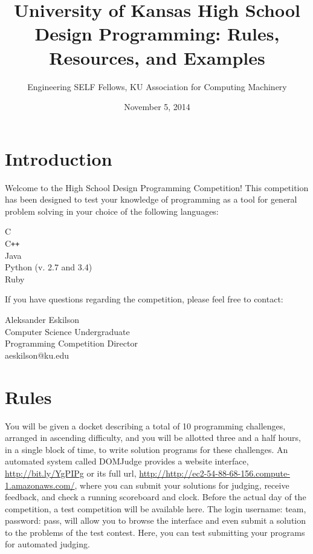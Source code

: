 \documentclass[a4paper]{article}
\title{University of Kansas High School Design Programming: Rules, Resources, and Examples}
\date{November 5, 2014}
\author{Engineering SELF Fellows, KU Association for Computing Machinery}
\begin{document}
\lstset{
    language=java,
    basicstyle=\ttfamily,
    numbers=left,
    numbersep=8pt,
    showspaces=false,
    showstringspaces=false
}
\maketitle

\tableofcontents

\newpage

\section{Introduction}

Welcome to the High School Design Programming Competition! This competition has been designed to test your knowledge of programming as a tool for general problem solving in your choice of the following languages:
\begin{center}
    C \\
    C\texttt{++} \\
    Java \\ 
    Python (v. 2.7 and 3.4) \\
    Ruby \\
\end{center}

If you have questions regarding the competition, please feel free to contact:
\begin{center}
    Aleksander Eskilson \\
    Computer Science Undergraduate \\
    Programming Competition Director \\
    aeskilson@ku.edu \\
\end{center}

\newpage

\section{Rules}

You will be given a docket describing a total of 10 programming challenges, arranged in ascending difficulty, and you will be allotted three and a half hours, in a single block of time, to write solution programs for these challenges. An automated system called DOMJudge provides a website interface, \url{http://bit.ly/YgPIPg} or its full url, \url{http://http://ec2-54-88-68-156.compute-1.amazonaws.com/}, where you can submit your solutions for judging, receive feedback, and check a running scoreboard and clock. Before the actual day of the competition, a test competition will be available here. The login username: team, password: pass, will allow you to browse the interface and even submit a solution to the problems of the test contest. Here, you can test submitting your programs for automated judging. 
\end{document}
